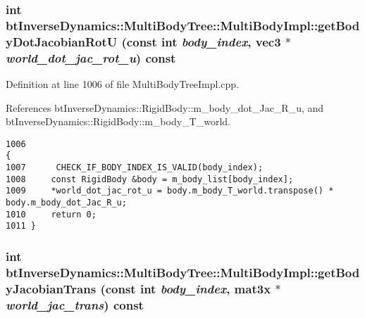 \hypertarget{classbt_inverse_dynamics_1_1_multi_body_tree_1_1_multi_body_impl_dd377929159d3005cb80eb694ebed57e}{
\subsubsection[getBodyDotJacobianRotU]{\setlength{\rightskip}{0pt plus 5cm}int btInverseDynamics::MultiBodyTree::MultiBodyImpl::getBodyDotJacobianRotU (const int {\em body\_\-index}, \/  {\bf vec3} $\ast$ {\em world\_\-dot\_\-jac\_\-rot\_\-u}) const}}
\label{classbt_inverse_dynamics_1_1_multi_body_tree_1_1_multi_body_impl_dd377929159d3005cb80eb694ebed57e}


 

Definition at line 1006 of file MultiBodyTreeImpl.cpp.

References btInverseDynamics::RigidBody::m\_\-body\_\-dot\_\-Jac\_\-R\_\-u, and btInverseDynamics::RigidBody::m\_\-body\_\-T\_\-world.

\begin{Code}\begin{verbatim}1006                                                                                                             {
1007      CHECK_IF_BODY_INDEX_IS_VALID(body_index);
1008     const RigidBody &body = m_body_list[body_index];
1009     *world_dot_jac_rot_u = body.m_body_T_world.transpose() * body.m_body_dot_Jac_R_u;
1010     return 0;
1011 }
\end{verbatim}
\end{Code}


\hypertarget{classbt_inverse_dynamics_1_1_multi_body_tree_1_1_multi_body_impl_de8deee754a4e09bd652920a4e63875c}{
\subsubsection[getBodyJacobianTrans]{\setlength{\rightskip}{0pt plus 5cm}int btInverseDynamics::MultiBodyTree::MultiBodyImpl::getBodyJacobianTrans (const int {\em body\_\-index}, \/  mat3x $\ast$ {\em world\_\-jac\_\-trans}) const}}
\label{classbt_inverse_dynamics_1_1_multi_body_tree_1_1_multi_body_impl_de8deee754a4e09bd652920a4e63875c}


